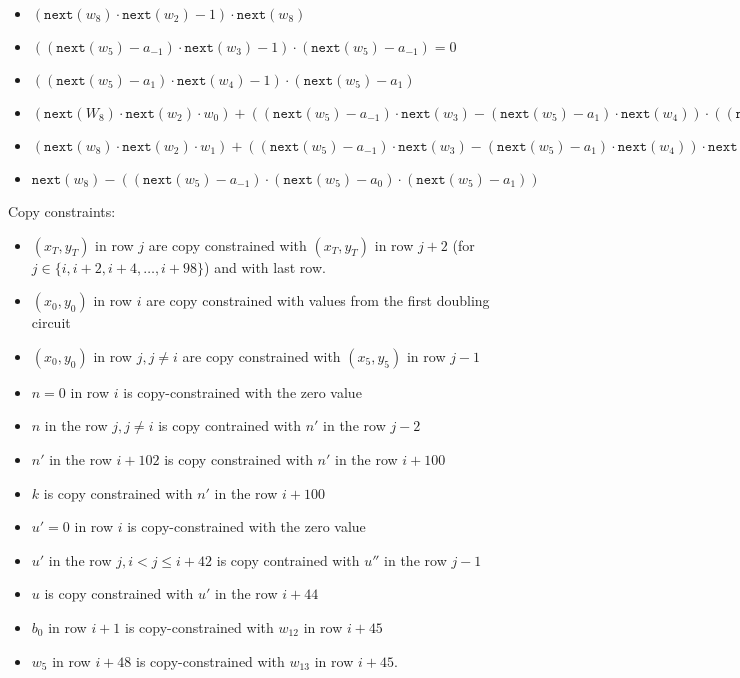 \begin{itemize}
    \item $(\texttt{next}(w_8) \cdot \texttt{next}(w_2) - 1) \cdot \texttt{next}(w_8)$
    \item $((\texttt{next}(w_5) - a_{-1}) \cdot \texttt{next}(w_3) - 1) \cdot (\texttt{next}(w_5) - a_{-1}) = 0$
    \item $((\texttt{next}(w_5) - a_1) \cdot \texttt{next}(w_4) - 1) \cdot (\texttt{next}(w_5) - a_1)$
	\item $(\texttt{next}(W_8) \cdot \texttt{next}(w_2) \cdot w_0) + ((\texttt{next}(w_5) - a_{-1}) \cdot \texttt{next}(w_3) - (\texttt{next}(w_5) - a_1) \cdot \texttt{next}(w_4)) \cdot ((\texttt{next}(w_5) - a_{-1}) \cdot \texttt{next}(w_3) - (\texttt{next}(w_5) - a_1) \cdot \texttt{next}(w_4)) \cdot \texttt{next}(w_6) - \texttt{next}(w_0) = 0$
    \item $(\texttt{next}(w_8)\cdot \texttt{next}(w_2) \cdot w_1) +((\texttt{next}(w_5) - a_{-1}) \cdot \texttt{next}(w_3) - (\texttt{next}(w_5) - a_1) \cdot \texttt{next}(w_4)) \cdot \texttt{next}(w_7) - \texttt{next}(w_1) = 0$
    \item $\texttt{next}(w_8) - ((\texttt{next}(w_5) - a_{-1}) \cdot (\texttt{next}(w_5) - a_0) \cdot (\texttt{next}(w_5) - a_1))$ 
\end{itemize}    
    Copy constraints:
    \begin{itemize}
    \item $(x_T,y_T)$ in row $j$ are copy constrained with $(x_T,y_T)$ in row $j + 2$ (for $j \in \{i, i + 2, i + 4, \dots, i + 98\}$) and with last row.
    \item $(x_0,y_0)$ in row $i$ are copy constrained with values from the first doubling circuit
    \item $(x_0,y_0)$ in row $j, j \neq i$ are copy constrained with $(x_5,y_5)$ in row $j - 1$ 
    \item $n = 0$ in row $i$ is copy-constrained with the zero value
    \item $n$ in the row $j, j \neq i$ is copy contrained with $n'$ in the row $j-2$
    \item $n'$ in the row $i + 102$ is copy constrained with $n'$ in the row $i + 100$
    \item $k$ is copy constrained with $n'$ in the row $i + 100$
    \item $u' = 0$ in row $i$ is copy-constrained with the zero value
    \item $u'$ in the row $j, i < j \leq i+42 $ is copy contrained with $u''$ in the row $j-1$
    \item $u$ is copy constrained with $u'$ in the row $i + 44$
    \item $b_0$ in row $i+1$ is copy-constrained with $w_{12}$ in row $i + 45$
    \item $w_5$ in row $i+48$ is copy-constrained with $w_{13}$ in row $i + 45$.
\end{itemize}

